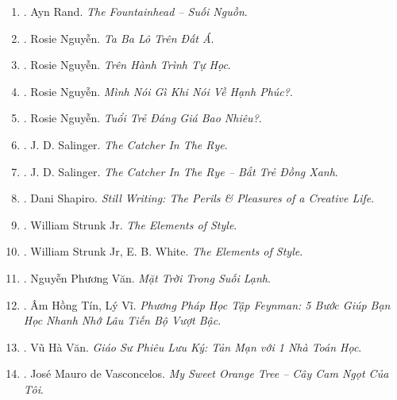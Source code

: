 \documentclass{article}
\begin{document}
\begin{enumerate}
	\item \cite{Rand_fountainhead}. Ayn Rand. {\it The Fountainhead -- Suối Nguồn}.\hfill{\sf[done]}
	
	\item \cite{Rosie_travel}. Rosie Nguyễn. {\it Ta Ba Lô Trên Đất Á}.\hfill{\sf[done]}
	
	\item \cite{Rosie_self_study}. Rosie Nguyễn. {\it Trên Hành Trình Tự Học}.\hfill{\sf[done]}
	
	\item \cite{Rosie_happy}. Rosie Nguyễn. {\it Mình Nói Gì Khi Nói Về Hạnh Phúc?}.\hfill{\sf[done]}
	
	\item \cite{Rosie_youth}. Rosie Nguyễn. {\it Tuổi Trẻ Đáng Giá Bao Nhiêu?}.\hfill{\sf[done]}
	
	\item \cite{Salinger_catcher_in_rye}. {\sc J. D. Salinger}. {\it The Catcher In The Rye}.
	
	\item \cite{Salinger_btdx}. {\sc J. D. Salinger}. {\it The Catcher In The Rye -- Bắt Trẻ Đồng Xanh}.\hfill{\sf[done]}
	
	\item \cite{Shapiro2014}. Dani Shapiro. {\it Still Writing: The Perils \& Pleasures of a Creative Life}.\hfill{\sf[reading]}
	
	\item \cite{Strunk_element_style}. William Strunk Jr. {\it The Elements of Style}.\hfill{\sf[done]}
	
	\item \cite{Strunk_White_element_style}. William Strunk Jr, E. B. White. {\it The Elements of Style}.\hfill{\sf[done]}
	
	\item \cite{Van_mat_troi_suoi_lanh}. Nguyễn Phương Văn. {\it Mặt Trời Trong Suối Lạnh}.\hfill{\sf[done]}
	
	\item \cite{Tin_Vi_Feynmann_learn_methods}. {\sc Âm Hồng Tín, Lý Vĩ}. {\it Phương Pháp Học Tập Feynman: 5 Bước Giúp Bạn Học Nhanh Nhớ Lâu Tiến Bộ Vượt Bậc}.\hfill{\sf[done]}
	
	\item \cite{Van_prof_journey}. Vũ Hà Văn. {\it Giáo Sư Phiêu Lưu Ký: Tản Mạn với 1 Nhà Toán Học}.\hfill{\sf[done]}
	
	\item \cite{Vasconcelos_orange_tree}. Jos\'e Mauro de Vasconcelos. {\it My Sweet Orange Tree -- Cây Cam Ngọt Của Tôi}.\hfill{\sf[done]}
	

\end{enumerate}
\end{document}
